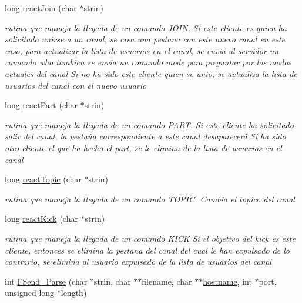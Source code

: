 \begin{DoxyCompactItemize}
long \hyperlink{_g-2301-05-_p2-basic_commands_from_server_8c_aac734783cf3067915cdfe1d4968cf8d1}{react\-Join} (char $\ast$strin)
\begin{DoxyCompactList}\small\item\em rutina que maneja la llegada de un comando J\-O\-I\-N. Si este cliente es quien ha solicitado unirse a un canal, se crea una pestana con este nuevo canal en este caso, para actualizar la lista de usuarios en el canal, se envia al servidor un comando who tambien se envia un comando mode para preguntar por los modos actuales del canal Si no ha sido este cliente quien se unio, se actualiza la lista de usuarios del canal con el nuevo usuario \end{DoxyCompactList}\item 
long \hyperlink{_g-2301-05-_p2-basic_commands_from_server_8c_a28c3a9c34508c23d3f81c2326101e8e7}{react\-Part} (char $\ast$strin)
\begin{DoxyCompactList}\small\item\em rutina que maneja la llegada de un comando P\-A\-R\-T. Si este cliente ha solicitado salir del canal, la pestaña correspondiente a este canal desaparecerá Si ha sido otro cliente el que ha hecho el part, se le elimina de la lista de usuarios en el canal \end{DoxyCompactList}\item 
long \hyperlink{_g-2301-05-_p2-basic_commands_from_server_8c_a1d86d105c8fe9b9fc6c55c5bc2406f37}{react\-Topic} (char $\ast$strin)
\begin{DoxyCompactList}\small\item\em rutina que maneja la llegada de un comando T\-O\-P\-I\-C. Cambia el topico del canal \end{DoxyCompactList}\item 
long \hyperlink{_g-2301-05-_p2-basic_commands_from_server_8c_a4f7dc613a25eb6eda89ad289feec5f16}{react\-Kick} (char $\ast$strin)
\begin{DoxyCompactList}\small\item\em rutina que maneja la llegada de un comando K\-I\-C\-K Si el objetivo del kick es este cliente, entonces se elimina la pestana del canal del cual le han expulsado de lo contrario, se elimina al usuario expulsado de la lista de usuarios del canal \end{DoxyCompactList}\item 
int \hyperlink{_g-2301-05-_p2-basic_commands_from_server_8c_ad2ca292b4e5365950f6ea7887abdbc37}{F\-Send\-\_\-\-Parse} (char $\ast$strin, char $\ast$$\ast$filename, char $\ast$$\ast$\hyperlink{servidor___i_r_c_8c_af203df082d5c6dcaa0c88b07cf86466d}{hostname}, int $\ast$port, unsigned long $\ast$length)

\end{DoxyCompactItemize}
